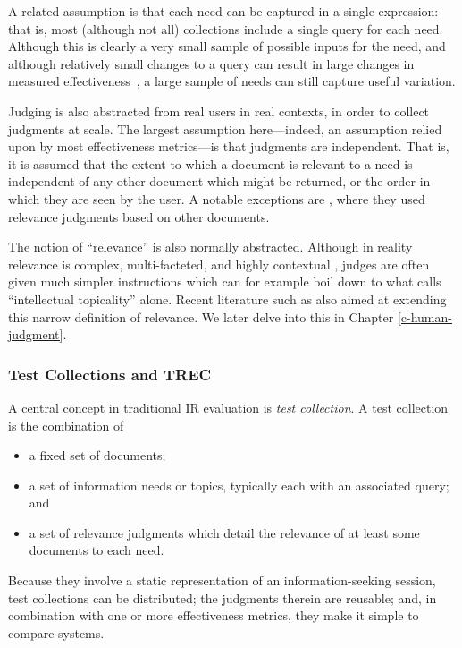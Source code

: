 A related assumption is that each need can be captured in a single expression: that is, most (although not all) collections include a single query for each need.  Although this is clearly a very small sample of possible inputs for the need, and although relatively small changes to a query can result in large changes in measured effectiveness~\citep{bailey15user}, a large sample of needs can still capture useful variation.

Judging is also abstracted from real users in real contexts, in order to collect judgments at scale. The largest assumption here---indeed, an assumption relied upon by most effectiveness metrics---is that judgments are independent. That is, it is assumed that the extent to which a document is relevant to a need is independent of any other document which might be returned, or the order in which they are seen by the user. A notable exceptions are \cite{Golbus:2014:CDR,Chandar2013}, where they used relevance judgments based on other documents.

The notion of ``relevance'' is also normally abstracted. Although in reality relevance is complex, multi-facteted, and highly contextual \citep{borlund2003,saracevic16relevance}, judges are often given much simpler instructions which can for example boil down to what \cite{borlund2003} calls ``intellectual topicality'' alone. Recent literature such as \cite{Mao:2016,VermaYC16} also aimed at extending this narrow definition of relevance. We later delve into this in Chapter \ref{c-human-judgment}.

\subsubsection{Test Collections and TREC}

A central concept in traditional IR evaluation is \emph{test collection}. A test collection is the combination of 

\begin{itemize}
	\item a fixed set of documents; 
	\item a set of information needs or topics, typically each with an associated query; and 
	\item a set of relevance judgments which detail the relevance of at least some documents to each need.
\end{itemize}

Because they involve a static representation of an information-seeking session, test collections can be distributed; the judgments therein are reusable; and, in combination with one or more effectiveness metrics, they make it simple to compare systems.

